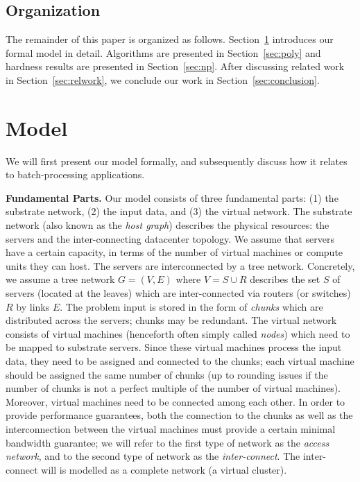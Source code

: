 \documentclass[9pt,twocolumn]{scrartcl}
\begin{document}
\subsection{Organization}

The remainder of this paper is organized as follows.
Section~\ref{sec:model} introduces our formal model in detail.
Algorithms are presented in Section~\ref{sec:poly} and
hardness results are presented in Section~\ref{sec:np}.
After discussing related work in Section~\ref{sec:relwork},
we conclude our work in Section~\ref{sec:conclusion}.


\section{Model}\label{sec:model}

We will first present our model formally, and subsequently discuss how it relates
to batch-processing applications.

\textbf{Fundamental Parts.} Our model consists of three fundamental parts: (1) the substrate network,
(2) the input data, and
(3) the virtual network.
The substrate network (also known as the \emph{host graph}) describes the physical resources: the servers
and the inter-connecting datacenter topology.
We assume that servers have a certain capacity, in terms of the number of virtual machines or compute units they
can host. The servers are interconnected by a tree network. Concretely, we assume a tree network
$G=(V,E)$ where $V=S \cup R$ describes the set $S$ of servers (located at the leaves) which are inter-connected
via routers (or switches) $R$ by links $E$.
The problem input is stored in the form of \emph{chunks} which are distributed across the servers;
chunks may be redundant.
The virtual network consists of virtual machines (henceforth often simply called \emph{nodes}) which need to be mapped to substrate servers.
Since these virtual machines process the input data, they need to be assigned and connected to the
chunks; each virtual machine should be assigned the same number of chunks (up to rounding issues if
the number of chunks is not a perfect multiple of the number of virtual machines). Moreover, virtual machines need to be connected among each other.
In order to provide performance guarantees, both the connection to the chunks
as well as the interconnection between the virtual machines must provide a certain
minimal bandwidth guarantee; we will refer to the first type of network as the \emph{access
network}, and to the second type of network as the \emph{inter-connect}. The inter-connect will
is modelled as a complete network (a virtual cluster).
\end{document}
